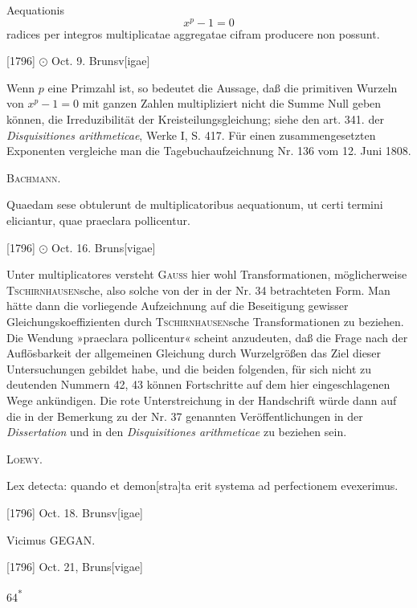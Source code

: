 \clearpage{}
\indent Aequationis
\[
x^p-1=0
\]
\noindent radices per integros multiplicatae aggregatae cifram producere non possunt.
\par\noindent\hfill[1796] \(\odot\) Oct. 9. Brunsv[igae]

\medskip\begingroup\small
\indent Wenn \(p\) eine Primzahl ist, so bedeutet die Aussage, daß die primitiven Wurzeln von \(x^p-1=0\) mit ganzen Zahlen multipliziert nicht die Summe Null geben können, die Irreduzibilität der Kreisteilungsgleichung; siehe den art. 341. der \textit{Disquisitiones arithmeticae}, Werke I, S. 417. Für einen zusammengesetzten Exponenten vergleiche man die Tagebuchaufzeichnung Nr. 136 vom 12. Juni 1808.
\par\noindent\hfill\textsc{Bachmann.}
\par\endgroup

\indent Quaedam sese obtulerunt de multiplicatoribus aequationum, ut certi termini eliciantur, quae praeclara pollicentur.
\par\noindent\hfill[1796] \(\odot\) Oct. 16. Bruns[vigae]

\medskip\begingroup\small
\indent Unter multiplicatores versteht \textsc{Gauss} hier wohl Transformationen, möglicherweise \textsc{Tschirnhausen}sche, also solche von der in der Nr. 34 betrachteten Form. Man hätte dann die vorliegende Aufzeichnung auf die Beseitigung gewisser Gleichungskoeffizienten durch \textsc{Tschirnhausen}sche Transformationen zu beziehen. Die Wendung »praeclara pollicentur« scheint anzudeuten, daß die Frage nach der Auflösbarkeit der allgemeinen Gleichung durch Wurzelgrößen das Ziel dieser Untersuchungen gebildet habe, und die beiden folgenden, für sich nicht zu deutenden Nummern 42, 43 können Fortschritte auf dem hier eingeschlagenen Wege ankündigen. Die rote Unterstreichung in der Handschrift würde dann auf die in der Bemerkung zu der Nr. 37 genannten Veröffentlichungen in der \textit{Dissertation} und in den \textit{Disquisitiones arithmeticae} zu beziehen sein.
\par\noindent\hfill\textsc{Loewy.}
\par\endgroup

\indent Lex detecta: quando et demon[stra]ta erit systema ad perfectionem evexerimus.
\par\noindent\hfill[1796] Oct. 18. Brunsv[igae]

\indent Vicimus GEGAN.
\par\noindent\hfill[1796] Oct. 21, Bruns[vigae]
\par\vfill\noindent\hfill64\textsuperscript{*}
